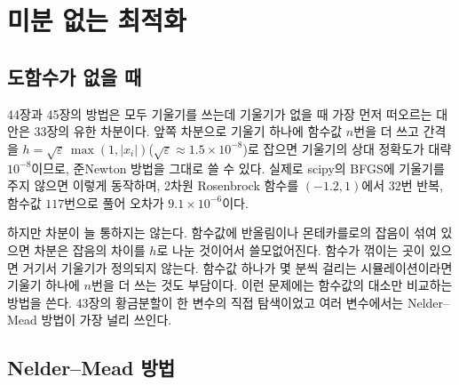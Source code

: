 \chapter{미분 없는 최적화}
\label{ch:derivative-free}


\section{도함수가 없을 때}
\label{sec:no-derivatives}

44장과 45장의 방법은 모두 기울기를 쓰는데 기울기가 없을 때 가장 먼저 떠오르는 대안은 33장의 유한 차분이다. 앞쪽 차분으로 기울기 하나에 함수값 $n$번을 더 쓰고 간격을 $h=\sqrt\varepsilon\,\max(1,|x_i|)$($\sqrt\varepsilon\approx1.5\times10^{-8}$)로 잡으면 기울기의 상대 정확도가 대략 $10^{-8}$이므로, 준Newton 방법을 그대로 쓸 수 있다. 실제로 scipy의 BFGS에 기울기를 주지 않으면 이렇게 동작하며, 2차원 Rosenbrock 함수를 $(-1.2,1)$에서 $32$번 반복, 함수값 $117$번으로 풀어 오차가 $9.1\times10^{-6}$이다.

하지만 차분이 늘 통하지는 않는다. 함수값에 반올림이나 몬테카를로의 잡음이 섞여 있으면 차분은 잡음의 차이를 $h$로 나눈 것이어서 쓸모없어진다. 함수가 꺾이는 곳이 있으면 거기서 기울기가 정의되지 않는다. 함수값 하나가 몇 분씩 걸리는 시뮬레이션이라면 기울기 하나에 $n$번을 더 쓰는 것도 부담이다. 이런 문제에는 함수값의 대소만 비교하는  방법을 쓴다. 43장의 황금분할이 한 변수의 직접 탐색이었고 여러 변수에서는 Nelder--Mead 방법이 가장 널리 쓰인다.

\section{Nelder--Mead 방법}
\label{sec:nelder-mead}


